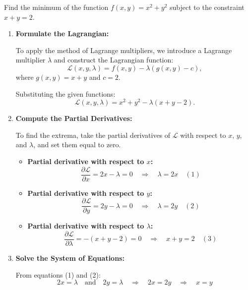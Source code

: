 \exampleline
\begin{example}
Find the minimum of the function \( f(x, y) = x^2 + y^2 \) subject to the constraint \( x + y = 2 \).

\begin{solution}
\begin{enumerate}
    \item \textbf{Formulate the Lagrangian:}
    
    To apply the method of Lagrange multipliers, we introduce a Lagrange multiplier \( \lambda \) and construct the Lagrangian function:
    \[
    \mathcal{L}(x, y, \lambda) = f(x, y) - \lambda (g(x, y) - c),
    \]
    where \( g(x, y) = x + y \) and \( c = 2 \).
    
    Substituting the given functions:
    \[
    \mathcal{L}(x, y, \lambda) = x^2 + y^2 - \lambda (x + y - 2).
    \]
    
    \item \textbf{Compute the Partial Derivatives:}
    
    To find the extrema, take the partial derivatives of \( \mathcal{L} \) with respect to \( x \), \( y \), and \( \lambda \), and set them equal to zero.
    
    \begin{itemize}
        \item \textbf{Partial derivative with respect to \( x \):}
        \[
        \frac{\partial \mathcal{L}}{\partial x} = 2x - \lambda = 0 \quad \Rightarrow \quad \lambda = 2x \quad (1)
        \]
        
        \item \textbf{Partial derivative with respect to \( y \):}
        \[
        \frac{\partial \mathcal{L}}{\partial y} = 2y - \lambda = 0 \quad \Rightarrow \quad \lambda = 2y \quad (2)
        \]
        
        \item \textbf{Partial derivative with respect to \( \lambda \):}
        \[
        \frac{\partial \mathcal{L}}{\partial \lambda} = -(x + y - 2) = 0 \quad \Rightarrow \quad x + y = 2 \quad (3)
        \]
    \end{itemize}
    
    \item \textbf{Solve the System of Equations:}
    
    From equations (1) and (2):
    \[
    2x = \lambda \quad \text{and} \quad 2y = \lambda \quad \Rightarrow \quad 2x = 2y \quad \Rightarrow \quad x = y
    \]
    

\end{enumerate}
\end{solution}
\end{example}

